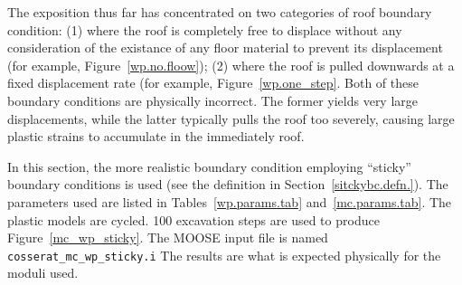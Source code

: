 \documentclass[]{scrreprt}
\begin{document}
The exposition thus far has concentrated on two categories of roof
boundary condition: (1) where the roof is completely free to displace
without any consideration of the existance of any floor material to
prevent its displacement (for example, Figure~\ref{wp.no.floow}); (2)
where the roof is pulled downwards at a fixed displacement rate (for
example, Figure~\ref{wp.one_step}.  Both of these boundary conditions
are physically incorrect.  The former yields very large
displacements, while the latter typically pulls the roof too severely,
causing large plastic strains to accumulate in the immediately roof.

In this section, the more realistic boundary condition employing
``sticky'' boundary conditions is used (see the definition in
Section~\ref{sitckybc.defn.}).   The
parameters used are listed in Tables~\ref{wp.params.tab}
and~\ref{mc.params.tab}.  The plastic models are
cycled.  100 excavation steps are used to
produce Figure~\ref{mc_wp_sticky}.     The MOOSE input file
is named {\tt cosserat\_mc\_wp\_sticky.i}  The results are what is expected
physically for the moduli used.
\end{document}
